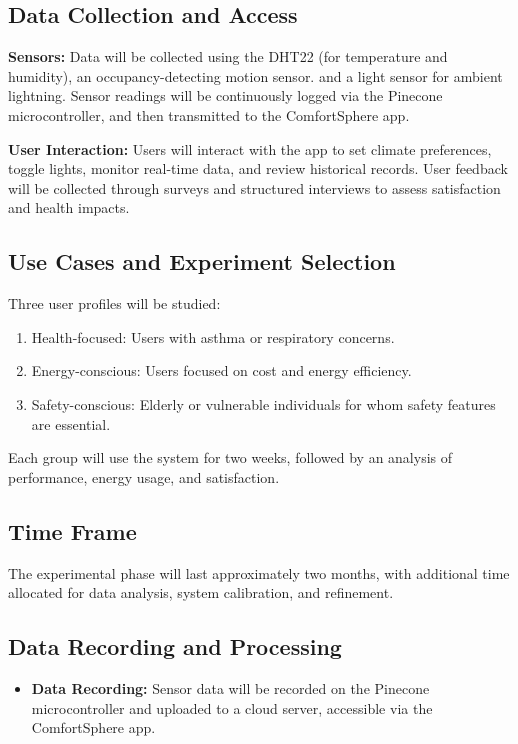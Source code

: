 \documentclass[a4paper]{scrartcl}
\begin{document}
\subsection{Data Collection and Access}
\textbf{Sensors:} Data will be collected using the DHT22 (for temperature
and humidity), an occupancy-detecting motion sensor. and a light
sensor for ambient lightning. Sensor readings will be continuously
logged via the Pinecone microcontroller, and then transmitted to the
ComfortSphere app.

\textbf{User Interaction:} Users will interact with the app to set climate preferences, toggle lights, monitor real-time data, and review historical
records. User feedback will be collected through surveys and structured interviews to assess satisfaction and health impacts.


\subsection{Use Cases and Experiment Selection}
Three user profiles will be studied:
\begin{enumerate}
    \item Health-focused: Users with asthma or respiratory concerns.
    \item Energy-conscious: Users focused on cost and energy efficiency.
    \item Safety-conscious: Elderly or vulnerable individuals for whom safety features are essential.
\end{enumerate}
Each group will use the system for two weeks, followed by an analysis of performance, energy usage, and satisfaction.

\subsection{Time Frame}
The experimental phase will last approximately two months, with additional time allocated for data analysis, system calibration, and refinement.

\subsection{Data Recording and Processing}

\begin{itemize}
    \item \textbf{Data Recording:} Sensor data will be recorded on the Pinecone microcontroller and uploaded to a cloud server, accessible via the ComfortSphere app.
\end{itemize}
\end{document}
